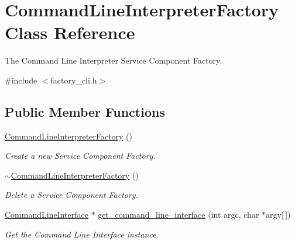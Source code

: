 \hypertarget{classCommandLineInterpreterFactory}{}\section{Command\+Line\+Interpreter\+Factory Class Reference}
\label{classCommandLineInterpreterFactory}


The Command Line Interpreter Service Component Factory.  




{\ttfamily \#include $<$factory\+\_\+cli.\+h$>$}

\subsection*{Public Member Functions}
\begin{DoxyCompactItemize}
\item 
\hyperlink{classCommandLineInterpreterFactory_aa4f324f58de8e2f6bee757d0b1db6840}{Command\+Line\+Interpreter\+Factory} ()\hypertarget{classCommandLineInterpreterFactory_aa4f324f58de8e2f6bee757d0b1db6840}{}\label{classCommandLineInterpreterFactory_aa4f324f58de8e2f6bee757d0b1db6840}

\begin{DoxyCompactList}\small\item\em Create a new Service Component Factory. \end{DoxyCompactList}\item 
\hyperlink{classCommandLineInterpreterFactory_ad5b908c917702e86074c4078fc4b1d6c}{$\sim$\+Command\+Line\+Interpreter\+Factory} ()\hypertarget{classCommandLineInterpreterFactory_ad5b908c917702e86074c4078fc4b1d6c}{}\label{classCommandLineInterpreterFactory_ad5b908c917702e86074c4078fc4b1d6c}

\begin{DoxyCompactList}\small\item\em Delete a Service Component Factory. \end{DoxyCompactList}\item 
\hyperlink{classCommandLineInterface}{Command\+Line\+Interface} $\ast$ \hyperlink{classCommandLineInterpreterFactory_aaa05f79ca3fdbae5b94bd6b82c3ec795}{get\+\_\+command\+\_\+line\+\_\+interface} (int argc, char $\ast$argv\mbox{[}$\,$\mbox{]})\hypertarget{classCommandLineInterpreterFactory_aaa05f79ca3fdbae5b94bd6b82c3ec795}{}\label{classCommandLineInterpreterFactory_aaa05f79ca3fdbae5b94bd6b82c3ec795}

\begin{DoxyCompactList}\small\item\em Get the Command Line Interface instance. \end{DoxyCompactList}\end{DoxyCompactItemize}



